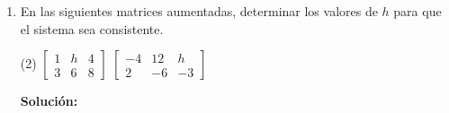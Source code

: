 \documentclass[12pt]{article}
\newenvironment{solucion}
{\begin{mdframed}[backgroundcolor=black!10]
		{\bf Solución:}\\
	}
	{
	\end{mdframed}
}
\newenvironment{preguntas}
{\begin{enumerate}\itemsep12pt
	}
	{
	\end{enumerate}
}
\newcommand{\ra}{\rightarrow}
\begin{document}
\begin{preguntas}
\begin{solucion}
$$\begin{array}{ccc|c}
		0 & 0 & 0 & 0
		\end{array}
		\right]  \sim \left[
		\begin{array}{ccc|c}
		1 & 0 & -1 & 7\\
		0 & 1 & -1 & -1\\
		0 & 0 & 0 & 0
		\end{array}
		\right] $$
		Esto corresponde al sistema
		$$\begin{array}{rcl}
		x_1 - x_3 & = & 7\\
		x_2 - x_3 & = & -1\\
		0 & = & 0
		\end{array} \ra \begin{array}{rcl}
		x_1 & = & x_3 + 7\\
		x_2 & = & x_3 - 1\\
		x_3 & = & x_3
		\end{array} $$
		Luego,
		$$x = \begin{pmatrix}
		x_3 + 7\\
		x_3 - 1\\
		x_3
		\end{pmatrix} = \begin{pmatrix}
		7\\
		- 1\\
		0
		\end{pmatrix} + x_3 \begin{pmatrix}
		1\\
		1\\
		1
		\end{pmatrix}$$
		Por último, la solución es
		$$S = \begin{pmatrix}
		7\\
		- 1\\
		0
		\end{pmatrix} + Gen\left\{\begin{pmatrix}
		1\\
		1\\
		1
		\end{pmatrix}\right\}$$
		Notemos que la solución del sistema homogeneo será lo mismo pero quitando el vector que no forma parte del generado, es decir
		$$S_H = Gen\left\{\begin{pmatrix}
		1\\
		1\\
		1
		\end{pmatrix}\right\}$$
\end{solucion}
\item En las siguientes matrices aumentadas, determinar los valores de $h$ para que el sistema sea consistente.
\begin{tasks}(2)
\task $
		\begin{bmatrix}
		1 & h & 4\\
		3 & 6 & 8
		\end{bmatrix}
		$
\task $
		\begin{bmatrix}
		-4 & 12 & h\\
		2 & -6 & -3
		\end{bmatrix}
		$
\end{tasks}
\begin{solucion}


\end{solucion}
\end{preguntas}
\end{document}

